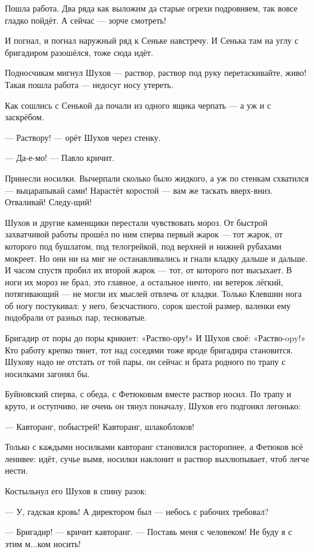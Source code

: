 Пошла работа. Два ряда как выложим да старые огрехи подровняем, так вовсе гладко пойдёт. А
сейчас --- зорче смотреть!

И погнал, и погнал наружный ряд к Сеньке навстречу. И Сенька там на углу с бригадиром
разошёлся, тоже сюда идёт.

Подносчикам мигнул Шухов --- раствор, раствор под руку перетаскивайте, живо! Такая пошла
работа --- недосуг носу утереть.

Как сошлись с Сенькой да почали из одного ящика черпать --- а уж и с заскрёбом.

--- Раствору! --- орёт Шухов через стенку.

--- Да-е-мо! --- Павло кричит.

Принесли носилки. Вычерпали сколько было жидкого, а уж по стенкам схватился --- выцарапывай
сами! Нарастёт коростой --- вам же таскать вверх-вниз. Отваливай! Следу-щий!

Шухов и другие каменщики перестали чувствовать мороз. От быстрой захватчивой работы прошёл
по ним сперва первый жарок --- тот жарок, от которого под бушлатом, под телогрейкой, под
верхней и нижней рубахами мокреет. Но они ни на миг не останавливались и гнали кладку дальше
и дальше. И часом спустя пробил их второй жарок --- тот, от которого пот высыхает. В ноги их
мороз не брал, это главное, а остальное ничто, ни ветерок лёгкий, потягивающий --- не могли их
мыслей отвлечь от кладки. Только Клевшин нога об ногу постукивал: у него, безсчастного, сорок
шестой размер, валенки ему подобрали от разных пар, тесноватые.

Бригадир от поры до поры крикнет: «Раство-ору!» И Шухов своё: «Раство-opy!» Кто работу крепко
тянет, тот над соседями тоже вроде бригадира становится. Шухову надо не отстать от той пары,
он сейчас и брата родного по трапу с носилками загонял бы.

Буйновский сперва, с обеда, с Фетюковым вместе раствор носил. По трапу и круто, и оступчиво,
не очень он тянул поначалу, Шухов его подгонял легонько:

--- Кавторанг, побыстрей! Кавторанг, шлакоблоков!

Только с каждыми носилками кавторанг становился расторопнее, а Фетюков всё ленивее: идёт,
сучье вымя, носилки наклонит и раствор выхлюпывает, чтоб легче нести.

Костыльнул его Шухов в спину разок:

--- У, гадская кровь! А директором был --- небось с рабочих требовал?

--- Бригадир! --- кричит кавторанг. --- Поставь меня с человеком! Не буду я с этим м...ком носить!

